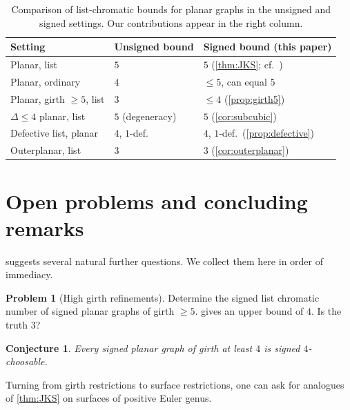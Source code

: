 \documentclass[11pt,a4paper]{article}
\theoremstyle{plain}
\newtheorem{conjecture}[theorem]{Conjecture}
\theoremstyle{definition}
\newtheorem{problem}[theorem]{Problem}
\begin{document}
\begin{table}[h!]
\centering
\renewcommand{\arraystretch}{1.25}
\begin{tabular}{|p{4.7cm}|p{4.6cm}|p{4.6cm}|}
\hline
\textbf{Setting} & \textbf{Unsigned bound} & \textbf{Signed bound (this paper)}\\
\hline
Planar, list & $5$~\cite{Thomassen1994} & $5$ (\cref{thm:JKS}; cf.~\cite{JinKangSteffen2016})\\
\hline
Planar, ordinary & $4$~\cite{AppelHaken1977} & $\le 5$, can equal $5$~\cite{KardosNarboni2021}\\
\hline
Planar, girth $\ge 5$, list & $3$~\cite{Thomassen1995} & $\le 4$ (\cref{prop:girth5})\\
\hline
$\Delta\le 4$ planar, list & $5$ (degeneracy) & $5$ (\cref{cor:subcubic})\\
\hline
Defective list, planar & $4$, $1$-def.~\cite{EatonHull1999} & $4$, $1$-def.\ (\cref{prop:defective})\\
\hline
Outerplanar, list & $3$~\cite{ChartrandGeller1969,ERT1979} & $3$ (\cref{cor:outerplanar})\\
\hline
\end{tabular}
\caption{Comparison of list-chromatic bounds for planar graphs in
the unsigned and signed settings. Our contributions appear in the
right column.}
\label{tab:comp}
\end{table}

\section{Open problems and concluding remarks}\label{sec:open}

 suggests several natural further questions. We
collect them here in order of immediacy.

\begin{problem}[High girth refinements]\label{prob:girth5}
Determine the signed list chromatic number of signed planar graphs
of girth $\ge 5$.  gives an upper bound of $4$.
Is the truth $3$?
\end{problem}

\begin{conjecture}\label{conj:girth4}
Every signed planar graph of girth at least $4$ is signed
$4$-choosable.
\end{conjecture}

Turning from girth restrictions to surface restrictions, one can
ask for analogues of \cref{thm:JKS} on surfaces of positive Euler
genus.
\end{document}
